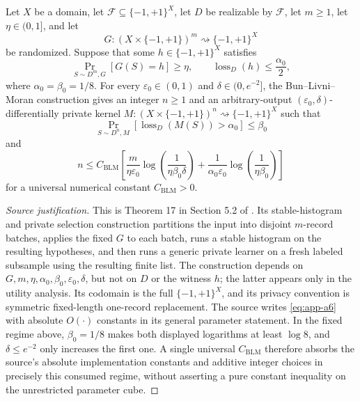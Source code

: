 \begin{theorem}
\label{thm:step-001-blm-selection}
Let \(X\) be a domain, let
\(\mathcal F\subseteq\{-1,+1\}^X\), let \(D\) be realizable by
\(\mathcal F\), let \(m\geq1\), let \(\eta\in(0,1]\), and let
\[
G:(X\times\{-1,+1\})^m
\rightsquigarrow\{-1,+1\}^X
\]
be randomized.  Suppose that some \(h\in\{-1,+1\}^X\) satisfies
\[
\Pr_{S\sim D^m,G}[G(S)=h]\geq\eta,
\qquad
\operatorname{loss}_D(h)\leq\frac{\alpha_0}{2},
\]
where \(\alpha_0=\beta_0=1/8\).  For every
\(\varepsilon_0\in(0,1)\) and \(\delta\in(0,e^{-2}]\), the
Bun--Livni--Moran construction gives an integer \(n\geq1\) and an
arbitrary-output \((\varepsilon_0,\delta)\)-differentially private
kernel \(M:(X\times\{-1,+1\})^n
\rightsquigarrow\{-1,+1\}^X\) such that
\[
\Pr_{S\sim D^n,M}
[\operatorname{loss}_D(M(S))>\alpha_0]\leq\beta_0
\]
and
\begin{equation}
n\leq C_{\mathrm{BLM}}
\left[
\frac{m}{\eta\varepsilon_0}
\log\!\left(\frac1{\eta\beta_0\delta}\right)
+
\frac1{\alpha_0\varepsilon_0}
\log\!\left(\frac1{\eta\beta_0}\right)
\right]
\label{eq:app-a6}
\end{equation}
for a universal numerical constant \(C_{\mathrm{BLM}}>0\).
\end{theorem}

\begin{proof}[Source justification]
This is Theorem 17 in Section 5.2 of
\citet{bun2021equivalence}.  Its stable-histogram and private
selection construction partitions the input into disjoint
\(m\)-record batches, applies the fixed \(G\) to each batch, runs a
stable histogram on the resulting hypotheses, and then runs a generic
private learner on a fresh labeled subsample using the resulting
finite list.  The construction depends on
\(G,m,\eta,\alpha_0,\beta_0,\varepsilon_0,\delta\), but not on \(D\)
or the witness \(h\); the latter appears only in the utility analysis.  Its
codomain is the full \(\{-1,+1\}^X\), and its privacy convention is
symmetric fixed-length one-record replacement.  The source writes
\eqref{eq:app-a6} with absolute \(O(\cdot)\) constants in its general parameter
statement.  In the fixed regime above, \(\beta_0=1/8\) makes both
displayed logarithms at least \(\log 8\), and \(\delta\leq e^{-2}\)
only increases the first one.  A single universal
\(C_{\mathrm{BLM}}\) therefore absorbs the source's absolute
implementation constants and additive integer choices in precisely
this consumed regime, without asserting a pure constant inequality on
the unrestricted parameter cube.
\end{proof}


